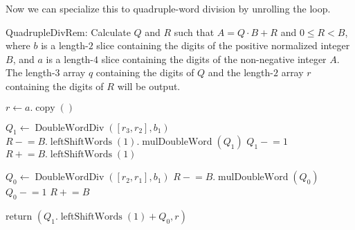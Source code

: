 \documentclass{computer-arithmetic}
\begin{document}
Now we can specialize this to quadruple-word division by unrolling the loop.

\begin{algorithm}
  \caption{QuadrupleDivRem: Calculate \(Q\) and \(R\) such that
    \(A = Q ⋅ B + R\) and \(0 ≤ R < B\), where \(b\) is a length-\(2\)
    slice containing the digits of the positive normalized integer
    \(B\), and \(a\) is a length-\(4\) slice
    containing the digits of the non-negative integer \(A\). The
    length-\(3\) array \(q\) containing the digits of \(Q\) and
    the length-\(2\) array \(r\) containing the digits of \(R\) will
    be output.}
  \begin{algorithmic}[1]
\State \(r ← a.\operatorname{copy}()\)

\State \(Q_1 ← \operatorname{DoubleWordDiv}([r_3, r_2], b_1)\)
\State \(R \mathrel{-}= B.\operatorname{leftShiftWords}(1).\operatorname{mulDoubleWord}(Q_1)\)
\State \(Q_1 \mathrel{-}= 1\)
\State \(R \mathrel{+}= B.\operatorname{leftShiftWords}(1)\)
\EndWhile

\State \(Q_0 ← \operatorname{DoubleWordDiv}([r_2, r_1], b_1)\)
\State \(R \mathrel{-}= B.\operatorname{mulDoubleWord}(Q_0)\)
\State \(Q_0 \mathrel{-}= 1\)
\State \(R \mathrel{+}= B\)
\EndWhile

\State return \((Q_1.\operatorname{leftShiftWords}(1) + Q_0, r)\)
\end{algorithmic}
\end{algorithm}
\end{document}
